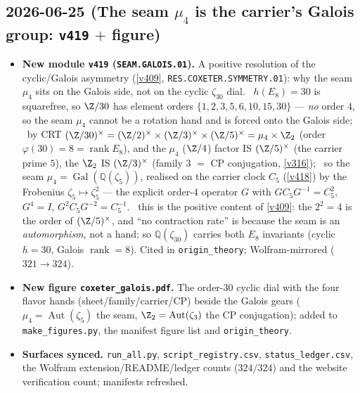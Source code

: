 \subsection*{2026-06-25 (The seam $\mu_4$ is the carrier's Galois group: \texttt{v419} $+$ figure)}
\begin{itemize}
\item \textbf{New module \texttt{v419} (\texttt{SEAM.GALOIS.01}).} A positive resolution of the
cyclic/Galois asymmetry (\vref{v409}, \texttt{RES.COXETER.SYMMETRY.01}): why the seam $\mu_4$ sits on the
Galois side, not on the cyclic $\zeta_{30}$ dial. \mE\ $h(E_8)=30$ is squarefree, so $\Z/30$ has element
orders $\{1,2,3,5,6,10,15,30\}$ --- \emph{no} order $4$, so the seam $\mu_4$ cannot be a rotation hand and
is forced onto the Galois side; \mE\ by CRT $(\Z/30)^\times=(\Z/2)^\times\times(\Z/3)^\times\times(\Z/5)^\times
=\mu_4\times\Z_2$ (order $\varphi(30)=8=\operatorname{rank}E_8$), and the $\mu_4$ ($\Z/4$) factor IS
$(\Z/5)^\times$ (the
carrier prime $5$), the $\Z_2$ IS $(\Z/3)^\times$ (family $3$ $=$ CP conjugation, \vref{v316}); \mE\ so the
seam $\mu_4=\operatorname{Gal}(\mathbb Q(\zeta_5))$, realised on the carrier clock $C_5$ (\vref{v418}) by the
Frobenius $\zeta_5\mapsto\zeta_5^2$ --- the explicit order-$4$ operator $G$ with $GC_5G^{-1}=C_5^2$, $G^4=I$,
$G^2C_5G^{-2}=C_5^{-1}$. \mC\ this is the positive content of \vref{v409}: the $2^2{=}4$ is the order of
$(\Z/5)^\times$, and ``no contraction rate'' is because the seam is an \emph{automorphism}, not a hand; so
$\mathbb Q(\zeta_{30})$ carries both $E_8$ invariants (cyclic $h{=}30$, Galois $\operatorname{rank}{=}8$).
Cited in \texttt{origin\_theory}; Wolfram-mirrored ($321\to324$).
\item \textbf{New figure \texttt{coxeter\_galois.pdf}.} The order-$30$ cyclic dial with the four flavor
hands (sheet/family/carrier/CP) beside the Galois gears ($\mu_4=\operatorname{Aut}(\zeta_5)$ the seam,
$\Z_2=\operatorname{Aut}(\zeta_3)$ the CP conjugation); added to \texttt{make\_figures.py}, the manifest
figure list and \texttt{origin\_theory}.
\item \textbf{Surfaces synced.} \texttt{run\_all.py}, \texttt{script\_registry.csv},
\texttt{status\_ledger.csv}, the Wolfram extension/README/ledger counts ($324/324$) and the website
verification count; manifests refreshed.
\end{itemize}

